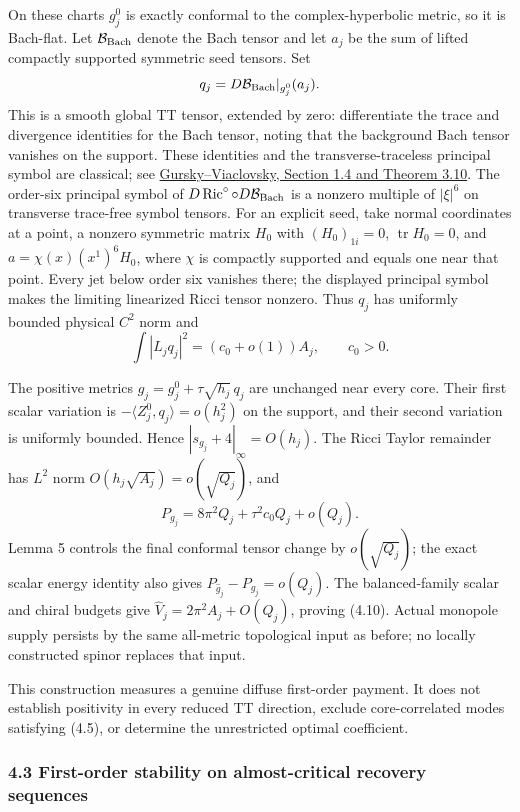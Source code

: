 \documentclass[
  10pt,
]{article}
\begin{document}
On these charts \(g_j^0\) is exactly conformal to the complex-hyperbolic
metric, so it is Bach-flat. Let \(\mathcal B_{\rm Bach}\) denote the
Bach tensor and let \(a_j\) be the sum of lifted compactly supported
symmetric seed tensors. Set \[
 q_j=D\mathcal B_{\rm Bach}|_{g_j^0}(a_j).
\] This is a smooth global TT tensor, extended by zero: differentiate
the trace and divergence identities for the Bach tensor, noting that the
background Bach tensor vanishes on the support. These identities and the
transverse-traceless principal symbol are classical; see
\href{https://arxiv.org/pdf/1105.4648}{Gursky--Viaclovsky, Section 1.4
and Theorem 3.10}. The order-six principal symbol of
\(D\operatorname{Ric}^{\circ}\circ D\mathcal B_{\rm Bach}\) is a nonzero
multiple of \(|\xi|^6\) on transverse trace-free symbol tensors. For an
explicit seed, take normal coordinates at a point, a nonzero symmetric
matrix \(H_0\) with \((H_0)_{1i}=0\), \(\operatorname{tr}H_0=0\), and
\(a=\chi(x)(x^1)^6H_0\), where \(\chi\) is compactly supported and
equals one near that point. Every jet below order six vanishes there;
the displayed principal symbol makes the limiting linearized Ricci
tensor nonzero. Thus \(q_j\) has uniformly bounded physical \(C^2\) norm
and \[
 \int|L_jq_j|^2=(c_0+o(1))A_j,\qquad c_0>0.
\]

The positive metrics \(g_j=g_j^0+\tau\sqrt{h_j}\,q_j\) are unchanged
near every core. Their first scalar variation is
\(-\langle Z_j^0,q_j\rangle=o(h_j^2)\) on the support, and their second
variation is uniformly bounded. Hence \(|s_{g_j}+4|_\infty=O(h_j)\). The
Ricci Taylor remainder has \(L^2\) norm
\(O(h_j\sqrt{A_j})=o(\sqrt{Q_j})\), and \[
 P_{g_j}=8\pi^2Q_j+\tau^2c_0Q_j+o(Q_j).
\] Lemma 5 controls the final conformal tensor change by
\(o(\sqrt{Q_j})\); the exact scalar energy identity also gives
\(P_{\widehat g_j}-P_{g_j}=o(Q_j)\). The balanced-family scalar and
chiral budgets give \(\widehat V_j=2\pi^2A_j+O(Q_j)\), proving (4.10).
Actual monopole supply persists by the same all-metric topological input
as before; no locally constructed spinor replaces that input.

This construction measures a genuine diffuse first-order payment. It
does not establish positivity in every reduced TT direction, exclude
core-correlated modes satisfying (4.5), or determine the unrestricted
optimal coefficient.

\hypertarget{first-order-stability-on-almost-critical-recovery-sequences}{%
\subsubsection{4.3 First-order stability on almost-critical recovery
sequences}\label{first-order-stability-on-almost-critical-recovery-sequences}}
\end{document}
